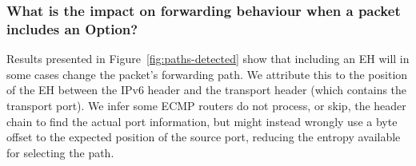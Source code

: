 \documentclass[conference]{IEEEtran}
\begin{document}








\subsubsection{What is the impact on forwarding behaviour when a packet includes an Option?}

Results presented in Figure~\ref{fig:paths-detected} show that including an EH will in some cases change the packet's forwarding path. We attribute this to the position of the EH between the IPv6 header and the transport header (which contains the transport port). We infer some ECMP routers do not process, or skip, the header chain to find the actual port information, but might instead wrongly use a byte offset to the expected position of the source port, reducing the entropy available for selecting the path.
\end{document}
